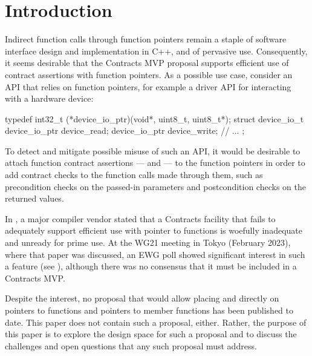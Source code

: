 
\tableofcontents*
\pagebreak





\section{Introduction}
\label{intro}

Indirect function calls through function pointers remain a staple of software interface design and implementation in C++, and of pervasive use. Consequently, it seems desirable that the Contracts MVP proposal \cite{P2900R8} supports efficient use of contract assertions with function pointers. As a possible use case, consider an API that relies on function pointers, for example a driver API for interacting with a hardware device:
\begin{codeblock}
typedef int32_t (*device_io_ptr)(void*, uint8_t, uint8_t*);
struct device_io_t {
  device_io_ptr device_read;
  device_io_ptr device_write;
  // ...
};
\end{codeblock}
To detect and mitigate possible misuse of such an API, it would be desirable to attach function contract assertions ---  and  --- to the function pointers in order to add contract checks to the function calls made through them, such as precondition checks on the passed-in parameters and postcondition checks on the returned values.

In \cite{P3173R0}, a major compiler vendor stated that a Contracts facility that fails to adequately support efficient use with pointer to functions is woefully inadequate and unready for prime use. At the WG21 meeting in Tokyo (February 2023), where that paper was discussed, an EWG poll showed significant interest in such a feature (see \cite{P3197R0}), although there was no consensus that it must be included in a Contracts MVP.

Despite the interest, no proposal that would allow placing  and  directly on pointers to functions and pointers to member functions has been published to date. This paper does not contain such a proposal, either. Rather, the purpose of this paper is to explore the design space for such a proposal and to discuss the challenges and open questions that any such proposal must address.

